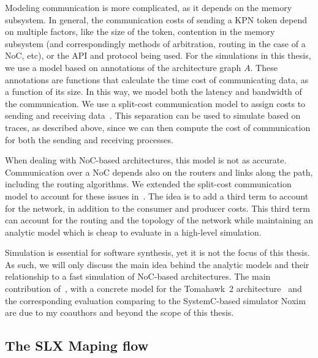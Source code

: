 Modeling communication is more complicated, as it depends on the memory subsystem. In general, the communication costs of sending a KPN token depend on multiple factors, like the size of the token, contention in the memory subsystem (and correspondingly methods of arbitration, routing in the case of a \ac{NoC}, etc), or the API and protocol being used.
For the simulations in this thesis, we use a model based on annotations of the architecture graph $A$. These annotations are functions that calculate the time cost of communicating data, as a function of its size.
In this way, we model both the latency and bandwidth of the communication.
We use a split-cost communication model to assign costs to sending and receiving data~\cite{odendahl2013split}.
This separation can be used to simulate based on traces, as described above, since we can then compute the cost of communication for both the sending and receiving processes.

When dealing with \ac{NoC}-based architectures, this model is not as accurate.
Communication over a \ac{NoC} depends also on the routers and links along the path, including the routing algorithms.
We extended the split-cost communication model to account for these issues in~\cite{menard_norcas16}.
The idea is to add a third term to account for the network, in addition to the consumer and producer costs. 
This third term can account for the routing and the topology of the network while maintaining an analytic model which is cheap to evaluate in a high-level simulation.

Simulation is essential for software synthesis, yet it is not the focus of this thesis. As such, we will only discuss the main idea behind the analytic models and their relationship to a fast simulation of \ac{NoC}-based architectures.
The main contribution of~\cite{menard_norcas16}, with a concrete model for the Tomahawk~2 architecture~\cite{tomahawk2} and the corresponding evaluation comparing to the SystemC-based simulator Noxim~\cite{noxim} are due to my coauthors and beyond the scope of this thesis.


\subsection{The SLX Maping flow}

